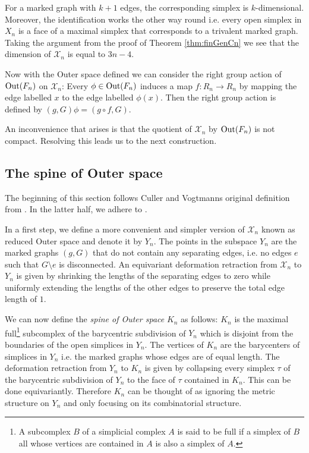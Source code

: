 For a marked graph with $k+1$ edges, the corresponding simplex is $k$-dimensional.
Moreover, the identification works the other way round i.e. every open simplex in $X_{n}$ 
is a face of a maximal simplex that corresponds to a trivalent marked graph.
Taking the argument from the proof of Theorem \ref{thm:finGenCn} we see that the dimension of $\mathcal{X}_{n}$ is equal to $3n -4$.

Now with the Outer space defined we can consider the right group action of $\operatorname{Out}(F_{n})$ on $\mathcal{X}_{n}$:
Every $\phi \in \operatorname{Out}(F_{n})$ induces a map $f: R_{n} \to R_{n}$ by mapping the edge labelled
$x$ to the edge labelled $\phi(x)$.
Then the right group action is defined by $(g,G) \phi = (g \circ f, G)$.

An inconvenience that arises is that the quotient of $\mathcal{X}_{n}$ by $\operatorname{Out}(F_{n})$ is not compact.
Resolving this leads us to the next construction.

\subsection{The spine of Outer space}
The beginning of this section follows Culler and Vogtmanns original definition from \cite{vogtmann86}.
In the latter half, we adhere to \cite{vogtmann16}.

In a first step, we define a more convenient and simpler version of $\mathcal{X}_{n}$ known as reduced Outer space and denote it by $Y_{n}$.
The points in the subspace $Y_{n}$ are the marked graphs $(g,G)$ that do not contain any separating edges, i.e.
no edges $e$ such that $G \setminus e$ is disconnected.
An equivariant deformation retraction from $\mathcal{X}_{n}$ to $Y_{n}$ is given by shrinking the lengths of
the separating edges to zero while uniformly extending the lengths of the other edges to preserve the total edge length of $1$.

We can now define the \emph{spine of Outer space} $K_{n}$ as follows:
$K_{n}$ is the maximal full\footnote{A subcomplex $B$ of a simplicial complex $A$ is said to be full if a simplex of $B$ all whose vertices are contained in $A$ is also a simplex of $A$.}
subcomplex of the barycentric subdivision of $Y_{n}$ which is disjoint from the boundaries of the open simplices in $Y_{n}$.
The vertices of $K_{n}$ are the barycenters of simplices in $Y_{n}$ i.e. the marked graphs whose edges are of equal length.
The deformation retraction from $Y_{n}$ to $K_{n}$ is given by
collapsing every simplex $\tau$ of the barycentric subdivision of $Y_{n}$ to the face of $\tau$ contained in $K_{n}$.
This can be done equivariantly.
Therefore $K_{n}$ can be thought of as ignoring the metric structure on $Y_{n}$ and only focusing on its combinatorial structure.

